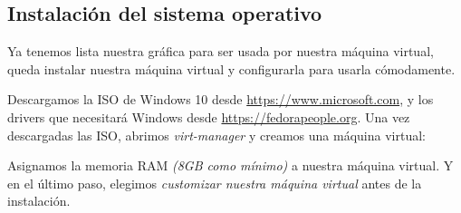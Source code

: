 \documentclass[11pt]{article}
\begin{document}
\subsection{Instalación del sistema operativo}

Ya tenemos lista nuestra gráfica para ser usada por nuestra máquina virtual, queda instalar nuestra máquina virtual y configurarla para usarla cómodamente.

\medskip
Descargamos la ISO de Windows 10 desde \href{https://www.microsoft.com/en-us/software-download/windows10ISO}{https://www.microsoft.com}, y los drivers que necesitará Windows desde \href{https://fedorapeople.org/groups/virt/virtio-win/direct-downloads/stable-virtio/virtio-win.iso}{https://fedorapeople.org}. Una vez descargadas las ISO, abrimos \emph{virt-manager} y creamos una máquina virtual:

\medskip
Asignamos la memoria RAM \emph{(8GB como mínimo)} a nuestra máquina virtual. Y en el último paso, elegimos \emph{customizar nuestra máquina virtual} antes de la instalación.
\end{document}
